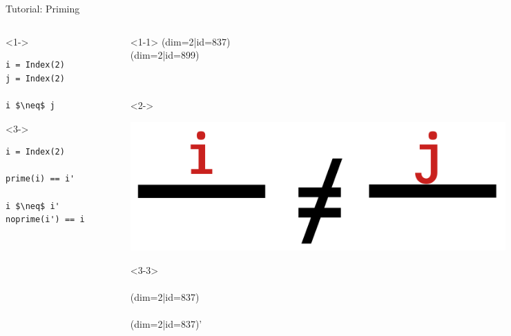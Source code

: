 \begin{frame}[fragile]{Tutorial: Priming}

\begin{columns}

\begin{column}{4.5cm}

\begin{onlyenv}<1->
\begin{lstlisting}[language=JuliaLocal, style=julia, mathescape, basicstyle=\scriptsize\ttfamily]
i = Index(2)
j = Index(2)

i $\neq$ j
\end{lstlisting}
\end{onlyenv}

\begin{onlyenv}<3->
\begin{lstlisting}[language=JuliaLocal, style=julia, mathescape, basicstyle=\scriptsize\ttfamily]
i = Index(2)

prime(i) == i'

i $\neq$ i'
noprime(i') == i
\end{lstlisting}
\end{onlyenv}

\end{column}

\begin{column}{4.5cm}

\begin{onlyenv}<1-1>
\vspace*{0.05cm}
(dim=2|id=837) \\
(dim=2|id=899) \\
~\\
~\\
\end{onlyenv}

\begin{onlyenv}<2->
\begin{center}
\includegraphics[width=0.8\textwidth]{
  slides/assets/i_neq_j.png
}
\end{center}
\end{onlyenv}

\begin{onlyenv}<3-3>
~\\
~\\
(dim=2|id=837) \\
~\\
(dim=2|id=837)' \\
~\\
~\\
~\\
~\\
\end{onlyenv}


\end{column}
\end{columns}
\end{frame}
